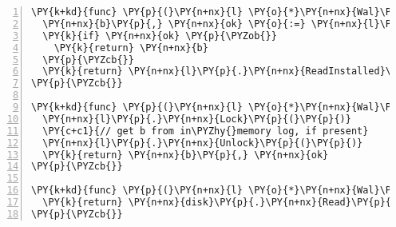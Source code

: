 \begin{Verbatim}[commandchars=\\\{\},numbers=left,firstnumber=1,stepnumber=1,codes={\catcode`\$=3\catcode`\^=7\catcode`\_=8},fontsize=\small,numbersep=6pt,xleftmargin=0.2in]
\PY{k+kd}{func} \PY{p}{(}\PY{n+nx}{l} \PY{o}{*}\PY{n+nx}{Wal}\PY{p}{)} \PY{n+nx}{Read}\PY{p}{(}\PY{n+nx}{a} \PY{k+kt}{uint64}\PY{p}{)} \PY{n+nx}{Block} \PY{p}{\PYZob{}}
  \PY{n+nx}{b}\PY{p}{,} \PY{n+nx}{ok} \PY{o}{:=} \PY{n+nx}{l}\PY{p}{.}\PY{n+nx}{ReadMem}\PY{p}{(}\PY{n+nx}{a}\PY{p}{)}
  \PY{k}{if} \PY{n+nx}{ok} \PY{p}{\PYZob{}}
    \PY{k}{return} \PY{n+nx}{b}
  \PY{p}{\PYZcb{}}
  \PY{k}{return} \PY{n+nx}{l}\PY{p}{.}\PY{n+nx}{ReadInstalled}\PY{p}{(}\PY{n+nx}{a}\PY{p}{)}
\PY{p}{\PYZcb{}}

\PY{k+kd}{func} \PY{p}{(}\PY{n+nx}{l} \PY{o}{*}\PY{n+nx}{Wal}\PY{p}{)} \PY{n+nx}{ReadMem}\PY{p}{(}\PY{n+nx}{a}\PY{p}{)} \PY{p}{(}\PY{n+nx}{Block}\PY{p}{,} \PY{k+kt}{bool}\PY{p}{)} \PY{p}{\PYZob{}}
  \PY{n+nx}{l}\PY{p}{.}\PY{n+nx}{Lock}\PY{p}{(}\PY{p}{)}
  \PY{c+c1}{// get b from in\PYZhy{}memory log, if present}
  \PY{n+nx}{l}\PY{p}{.}\PY{n+nx}{Unlock}\PY{p}{(}\PY{p}{)}
  \PY{k}{return} \PY{n+nx}{b}\PY{p}{,} \PY{n+nx}{ok}
\PY{p}{\PYZcb{}}

\PY{k+kd}{func} \PY{p}{(}\PY{n+nx}{l} \PY{o}{*}\PY{n+nx}{Wal}\PY{p}{)} \PY{n+nx}{ReadInstalled}\PY{p}{(}\PY{n+nx}{a} \PY{k+kt}{uint64}\PY{p}{)} \PY{n+nx}{Block} \PY{p}{\PYZob{}}
  \PY{k}{return} \PY{n+nx}{disk}\PY{p}{.}\PY{n+nx}{Read}\PY{p}{(}\PY{n+nx}{a}\PY{p}{)}
\PY{p}{\PYZcb{}}
\end{Verbatim}
